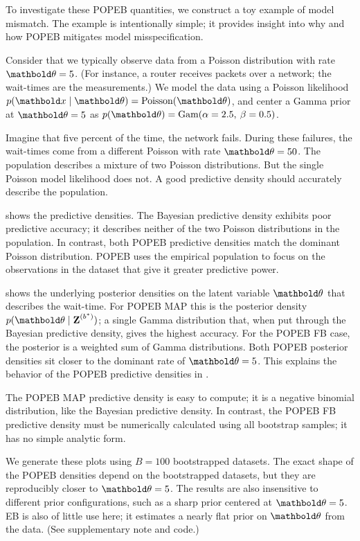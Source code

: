 To investigate these \gls{POPEB} quantities, we construct a toy example of
model mismatch. The example is intentionally simple; it provides insight
into why and how \gls{POPEB} mitigates model misspecification.

Consider that we typically observe data from a Poisson distribution
with rate $\mbtheta = 5$.
(For instance, a router receives packets over a network;
the wait-times are the measurements.)
We model the data using a Poisson likelihood
$p(\mbx \mid \mbtheta) = \text{Poisson}(\mbtheta)$,
and center a Gamma prior at $\mbtheta=5$ as $p(\mbtheta) = \Gam
(\alpha=2.5,\:
\beta=0.5)$.

Imagine that five percent of the time, the network fails. During these
failures, the wait-times come from a different Poisson with
rate $\mbtheta = 50$. The population describes a mixture
of two Poisson distributions. But the single Poisson model likelihood does not.
A good predictive density should accurately describe the population.

 shows the predictive densities.
The Bayesian predictive
density exhibits poor predictive accuracy; it describes neither
of the two Poisson distributions in the population. In contrast, both
\gls{POPEB} predictive densities match the dominant Poisson distribution.
\gls{POPEB} uses the empirical population to focus on the observations in the
dataset that give it greater predictive power.

 shows the underlying posterior densities on
the latent variable $\mbtheta$ that describes the wait-time. For \gls{POPEB}
\gls{MAP}
this is the posterior density $p(\mbtheta\mid\mbZ^{(b^*)})$; a single
Gamma distribution that, when put through the Bayesian predictive density,
gives the highest accuracy. For the \gls{POPEB} \gls{FB} case, the posterior is
a weighted
sum of Gamma distributions. Both \gls{POPEB} posterior densities sit closer
to the dominant rate of $\mbtheta=5$. This explains the behavior of the
\gls{POPEB} predictive densities in .

The \gls{POPEB} \gls{MAP} predictive density is easy to compute;
it is a negative binomial distribution, like the Bayesian predictive density.
In contrast, the \gls{POPEB} \gls{FB} predictive density must be numerically
calculated using all bootstrap samples; it has no simple analytic form.

We generate these plots using $B=100$ bootstrapped datasets. The exact shape of
the \gls{POPEB} densities depend on the bootstrapped datasets, but
they are reproducibly closer to $\mbtheta=5$.
The results are also insensitive to different prior configurations, such as
a sharp prior centered at $\mbtheta=5$. \gls{EB} is also of little
use here; it estimates a nearly flat prior on $\mbtheta$ from the data.
(See supplementary note and code.)


